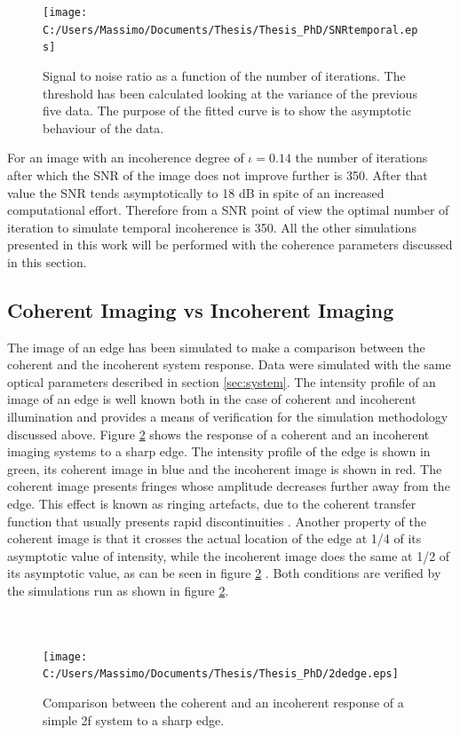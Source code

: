  \begin{figure}[H]
 	\centering
 	\texttt{[image: C:/Users/Massimo/Documents/Thesis/Thesis\_PhD/SNRtemporal.eps]}
 	\caption{\label{fig:SNRiter}Signal to noise ratio as a function of the number of iterations. The threshold has been calculated looking at the variance of the previous five data. The purpose of the fitted curve is to show the asymptotic behaviour of the data.}
 \end{figure}
 For an image with an incoherence degree of $\iota=0.14$ the number of iterations after which the SNR of the image does not improve further is 350. After that value the SNR tends asymptotically to 18 dB in spite of an increased computational effort. Therefore from a SNR point of view the optimal number of iteration to simulate temporal incoherence is 350. All the other simulations presented in this work will be performed with the coherence parameters discussed in this section. 
\subsection{Coherent Imaging vs Incoherent Imaging}
\label{sec:coherencevsinco}
The image of an edge has been simulated to make a comparison between the coherent and the incoherent system response. Data were simulated with the same optical parameters described in section \ref{sec:system}. The intensity profile of an image of an edge is well known both in the case of coherent and incoherent illumination and provides a means of verification for the simulation methodology discussed above. Figure \ref{fig:coherenceprofile} shows the response of a coherent and an incoherent imaging systems to a sharp edge. The intensity profile of the edge is shown in green, its coherent image in blue and the incoherent image is shown in red. The coherent image presents fringes whose amplitude decreases further away from the edge. This effect is known as ringing artefacts, due to the coherent transfer function that usually presents rapid discontinuities \cite{goodman2005introduction}. Another property of the coherent image is that it crosses the actual location of the edge at 1/4 of its asymptotic value of intensity, while the incoherent image does the same at 1/2 of its asymptotic value, as can be seen in figure \ref{fig:coherenceprofile} \cite{goodman2005introduction}. Both conditions are verified by the simulations run as shown in figure \ref{fig:coherenceprofile}. \\
\\
\\
\begin{figure}[H]
	\centering
	\texttt{[image: C:/Users/Massimo/Documents/Thesis/Thesis\_PhD/2dedge.eps]}
	\caption{\label{fig:coherenceprofile}Comparison between the coherent and an incoherent response of a simple 2f system to a sharp edge.}
\end{figure}
